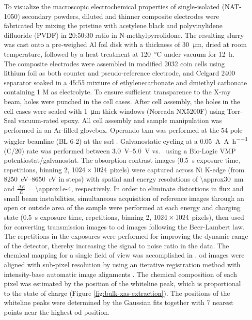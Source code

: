 \documentclass{article}
\begin{document}
To visualize the macroscopic electrochemical properties of
single-isolated \nca{} (NAT-1050) secondary powders, diluted and
thinner composite electrodes were fabricated by mixing the pristine
\nca{} with acetylene black and polyvinylidene difluoride (PVDF) in
20:50:30 ratio in N-methylpyrrolidone. The resulting slurry was cast
onto a pre-weighed Al foil disk with a thickness of
\SI{30}{\micro\meter}, dried at room temperature, followed by a heat
treatment at \SI{120}{\celsius} under vacuum for \SI{12}{\hour}. The
composite electrodes were assembled in  modified
2032 coin cells using lithium foil as both counter and
pseudo-reference electrode, and Celgard 2400 separator soaked in a
45:55 mixture of ethylenecarbonate and dmiethyl carbonate containing 1
M  as electrolyte. To ensure sufficient transparence to the
X-ray beam, holes were punched in the cell cases. After cell assembly,
the holes in the cell cases were sealed with \SI{1}{\micro\meter}
thick  windows (Norcada NX5200F) using Torr-Seal
vacuum-rated epoxy. All cell assembly and sample manipulation was
performed in an Ar-filled glovebox. Operando \gls{txm} was performed
at the 54 pole wiggler beamline (BL 6-2) at the \gls{ssrl}
\cite{yun2008}. Galvanostatic cycling at a
\SI{0.05}{\ampere\per\ampere\per\hour} (C/20) rate was performed
between \SIrange{3.0}{5.0}{\volt} vs.\  using a Bio-Logic
VMP potentiostat/galvanostat. The absorption contrast images
(\SI{0.5}{\second} exposure time,  repetitions,
binning 2, $\rm 1024\times 1024$ pixels) were captured across Ni
K-edge (from \SIrange{8250}{8650}{\electronvolt} in  steps) with spatial and energy resolutions of
\SI{\approx30}{\nano\meter} and $\frac{\Delta E}{E}$ =
\num{\approx1e-4}, respectively. In order to eliminate distortions in
flux and small beam instabilities, simultaneous acquisition of
reference images through an open or outside area of the sample were
performed at each energy and charging state (\SI{0.5}{\second}
exposure time,  repetitions, binning 2, $\rm 1024
\times 1024$ pixels), then used for converting transmission images to
\gls{od} images following the Beer-Lambert law. The repetitions in the
exposures were performed for improving the dynamic range of the
detector, thereby increasing the signal to noise ratio in the
data. The chemical mapping for a single field of view was accomplished
in . \Gls{od} images were aligned with
sub-pixel resolution by using an iterative registration method with
intensity-base automatic image alignments \cite{lee2019-3}. The
chemical composition of each pixel was estimated by the position of
the whiteline peak, which is proportional to the state of charge
(Figure \ref{fig:bulk-xas-extraction}). The positions of the whiteline
peaks were determined by the Gaussian fits together with 7 nearest
points near the highest \gls{od} position.
\end{document}
